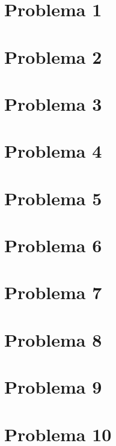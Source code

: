 

	\section{Problema 1}
	

	\section{Problema 2}
	

	\section{Problema 3}
	

	\section{Problema 4}
	

	\section{Problema 5}
	

	\section{Problema 6}
	

	\section{Problema 7}
	

	\section{Problema 8}
	

	\section{Problema 9}
	

	\section{Problema 10}
	


